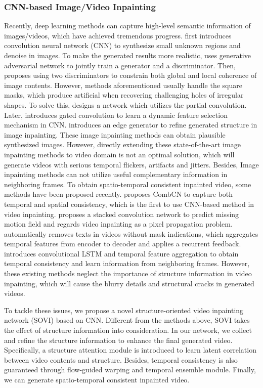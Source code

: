 \subsubsection{CNN-based Image/Video Inpainting }
Recently, deep learning methods can capture high-level semantic information of images/videos, which have achieved tremendous progress. \cite{xie2012image} first introduces convolution neural network (CNN) to synthesize small unknown regions and denoise in images. To make the generated results more realistic, \cite{pathak2016context} uses generative adversarial network to jointly train a generator and a discriminator. Then, \cite{iizuka2017globally} proposes using two discriminators to constrain both global and local coherence of image contents. However, methods aforementioned usually handle the square masks, which produce artificial when recovering challenging holes of irregular shapes. To solve this,
 \cite{liu2018partialinpainting} designs a network which utilizes the partial convolution. Later, \cite{yu2018free} introduces gated convolution to learn a dynamic feature selection mechanism in CNN.  \cite{nazeri2019edgeconnect} introduces an edge generator to refine generated structure in image inpainting. These image inpainting methods can obtain plausible synthesized images. However, directly extending these state-of-the-art image inpainting methods to video domain is not an optimal solution, which will generate videos with serious temporal flickers, artifacts and jitters. Besides, Image inpainting methods can not utilize useful complementary information in neighboring frames. To obtain spatio-temporal consistent inpainted video, some methods have been proposed recently.
\cite{wang2019video} proposes CombCN to capture both temporal and spatial consistency, which is the first to use CNN-based method in video inpainting. \cite{Xu_2019_CVPR} proposes a stacked convolution network to predict missing motion field and regards video inpainting as a pixel propagation problem. \cite{Kim_2019_CVPR} automatically removes texts in videos without mask indications, which aggregates temporal features from encoder to decoder and applies a recurrent feedback. \cite{Kim_2019_CVPR1} introduces convolutional LSTM and temporal feature aggregation to obtain temporal consistency and learn information from neighboring frames. However, these existing methods neglect the importance of structure information in video inpainting, which will cause the blurry details and structural cracks in generated videos. 

To tackle these issues, we propose a novel structure-oriented video inpainting network (SOVI) based on CNN.
 Different from the methods above, SOVI
takes the effect of structure information into consideration. In our network, we collect and refine the structure information to enhance the final generated video. Specifically, a structure attention module is introduced to learn latent correlation between video contents and structure. Besides, temporal consistency is also guaranteed through flow-guided warping and temporal ensemble module. Finally, we can generate spatio-temporal consistent inpainted video. 